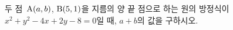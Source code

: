 두 점~$\mathrm{A}(a{,}\mkern3mu\mathopen{}b)$, $\mathrm{B}(5{,}\mkern3mu\mathopen{}1)$을 지름의 양 끝 점으로 하는 원의 방정식이 $x^2+y^2-4x+2y-8=0$일 때, $a+b$의 값을 구하시오.
